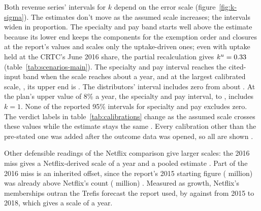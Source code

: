 Both revenue series' intervals for \(k\) depend on the error scale (figure~\ref{fig:k-sigma}). The estimates don't move as the assumed scale increases; the intervals widen in proportion. The specialty and pay band starts well above the estimate because its lower end keeps the components for the exemption order and closures at the report's values and scales only the uptake-driven ones; even with uptake held at the CRTC's June 2016 share, the partial recalculation gives \(k^{u}=0.33\) (table~\ref{tab:scenarios-main}). The specialty and pay interval reaches the cited-input band when the scale reaches about \lttvCutoffSpec{} a year, and at the largest calibrated scale, \lttvSigmaWidest{}, its upper end is \lttvKSpecHiWidest{}. The distributors' interval includes zero from about \lttvCutoffBDU{}. At the plan's upper value of 8\% a year, the specialty and pay interval, \lttvKSpecLoEight{} to \lttvKSpecHiEight{}, includes \(k=1\). None of the reported 95\% intervals for specialty and pay excludes zero. The verdict labels in table~\ref{tab:calibrations} change as the assumed scale crosses these values while the estimate stays the same \citep{gelmanStern2006difference}. Every calibration other than the pre-stated one was added after the outcome data was opened, so all are shown \citep{gelman2014statcrisis}.

Other defensible readings of the Netflix comparison give larger scales: the 2016 miss gives a Netflix-derived scale of \lttvSigmaTechSixteen{} a year and a pooled estimate \lttvSigmaTechPooled{}. Part of the 2016 miss is an inherited offset, since the report's 2015 starting figure (\lttvNetflixFcFifteen{} million) was already above Netflix's count (\lttvNetflixObsFifteen{} million) \citep{netflix2018form10k}. Measured as growth, Netflix's memberships outran the Trefis forecast the report used, by \lttvNetflixObsGrowth{} against \lttvNetflixFcGrowth{} from 2015 to 2018, which gives a scale of \lttvSigmaGrowthEighteen{} a year.

